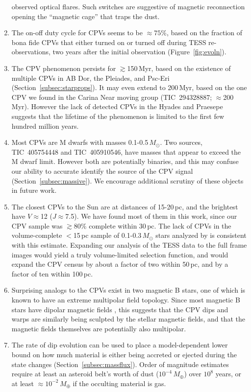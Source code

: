 \documentclass[11pt,twocolumn,tighten]{aastex63}
\begin{document}
\begin{enumerate}[leftmargin=*]
      observed optical flares.  Such switches are suggestive of
      magnetic reconnection opening the ``magnetic cage'' that traps
      the dust.
%
    \item The on-off duty cycle for CPVs seems to be $\approx$$75$\%, based
      on the fraction of bona fide CPVs that either turned on or turned
      off during TESS re-observations, two years after the initial
      observation (Figure~\ref{fig:evoln}).
%
    \item The CPV phenomenon persists for $\gtrsim$150\,Myr, based on
      the existence of multiple CPVs in AB Dor, the Pleiades, and
      Psc-Eri (Section~\ref{subsec:starprops}).  It may even extend to
      200\,Myr, based on the one CPV we found in the Carina Near
      moving group (TIC~294328887; $\approx$200\,Myr).  However the
      lack of detected CPVs in the Hyades and Praesepe suggests that
      the lifetime of the phenomenon is limited to the first few
      hundred million years.
%
    \item Most CPVs are M dwarfs with masses
      0.1-0.5\,$M_\odot$.  Two sources, TIC~405754448 and
      TIC~405910546, have masses that appear to exceed the M dwarf
      limit.  However both are potentially binaries, and this may
      confuse our ability to accurate identify the source of the CPV
      signal (Section~\ref{subsec:massive}).  We encourage additional
      scrutiny of these objects in future work.
%
    \item The closest CPVs to the Sun are at distances of 15-20\,pc,
      and the brightest have $V$$\approx$12 ($J$$\approx$7.5).  We
      have found most of them in this work, since our CPV sample was
      $\gtrsim$80\% complete within 30\,pc.  The lack of CPVs in the
      volume-complete $<$15\,pc sample of 0.1-0.3\,$M_\odot$ stars
      analyzed by \citet{2021AJ....161...63W} is consistent with this
      estimate.  Expanding our analysis of the TESS data to the full
      frame images would yield a truly volume-limited selection
      function, and would expand the CPV census by about a factor of
      two within 50\,pc, and by a factor of ten within 100\,pc.
%
    \item Surprising analogs to the CPVs exist in two magnetic B stars,
      one of which is known to have an extreme multipolar field
      topology.  Since most magnetic B stars have dipolar magnetic
      fields \citep{2009ARA&A..47..333D}, this suggests that the CPV
      dips and warps are similarly being sculpted by the stellar
      magnetic fields, and that the magnetic fields themselves are
      potentially also multipolar.
%
    \item The rate of dip evolution can be used to place a
      model-dependent lower bound on how much material is either being
      accreted or ejected during the state changes
      (Section~\ref{subsec:massflux}).  Order of magnitude estimates
      require at least an asteroid belt's worth of dust
      ($10^{-4}$\,$M_\oplus$) over $10^8$ years, or at least
      $\approx$$10^{-2}$\,$M_\oplus$ if the occulting material is gas.
\end{enumerate}
\end{document}
